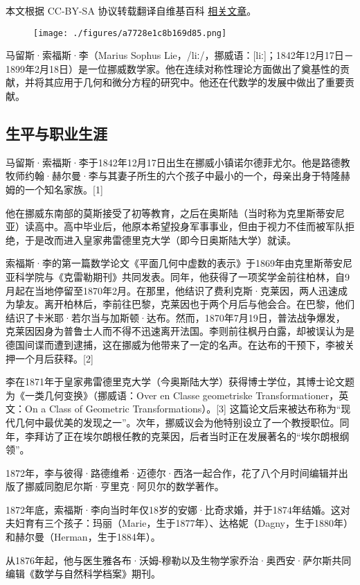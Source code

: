 
本文根据 CC-BY-SA 协议转载翻译自维基百科 \href{https://en.wikipedia.org/wiki/Sophus_Lie}{相关文章}。

\begin{figure}[ht]
\centering
\texttt{[image: ./figures/a7728e1c8b169d85.png]}
\caption{} \label{fig_SFSL_1}
\end{figure}
马留斯·索福斯·李（Marius Sophus Lie，/liː/，挪威语：[liː]；1842年12月17日－1899年2月18日）是一位挪威数学家。他在连续对称性理论方面做出了奠基性的贡献，并将其应用于几何和微分方程的研究中。他还在代数学的发展中做出了重要贡献。
\subsection{生平与职业生涯}
马留斯·索福斯·李于1842年12月17日出生在挪威小镇诺尔德菲尤尔。他是路德教牧师约翰·赫尔曼·李与其妻子所生的六个孩子中最小的一个，母亲出身于特隆赫姆的一个知名家族。[1]

他在挪威东南部的莫斯接受了初等教育，之后在奥斯陆（当时称为克里斯蒂安尼亚）读高中。高中毕业后，他原本希望投身军事事业，但由于视力不佳而被军队拒绝，于是改而进入皇家弗雷德里克大学（即今日奥斯陆大学）就读。

索福斯·李的第一篇数学论文《平面几何中虚数的表示》于1869年由克里斯蒂安尼亚科学院与《克雷勒期刊》共同发表。同年，他获得了一项奖学金前往柏林，自9月起在当地停留至1870年2月。在那里，他结识了费利克斯·克莱因，两人迅速成为挚友。离开柏林后，李前往巴黎，克莱因也于两个月后与他会合。在巴黎，他们结识了卡米耶·若尔当与加斯顿·达布。然而，1870年7月19日，普法战争爆发，克莱因因身为普鲁士人而不得不迅速离开法国。李则前往枫丹白露，却被误认为是德国间谍而遭到逮捕，这在挪威为他带来了一定的名声。在达布的干预下，李被关押一个月后获释。[2]

李在1871年于皇家弗雷德里克大学（今奥斯陆大学）获得博士学位，其博士论文题为《一类几何变换》（挪威语：Over en Classe geometriske Transformationer，英文：On a Class of Geometric Transformations）。[3] 这篇论文后来被达布称为“现代几何中最优美的发现之一”。次年，挪威议会为他特别设立了一个教授职位。同年，李拜访了正在埃尔朗根任教的克莱因，后者当时正在发展著名的“埃尔朗根纲领”。

1872年，李与彼得·路德维希·迈德尔·西洛一起合作，花了八个月时间编辑并出版了挪威同胞尼尔斯·亨里克·阿贝尔的数学著作。

1872年底，索福斯·李向当时年仅18岁的安娜·比奇求婚，并于1874年结婚。这对夫妇育有三个孩子：玛丽（Marie，生于1877年）、达格妮（Dagny，生于1880年）和赫尔曼（Herman，生于1884年）。

从1876年起，他与医生雅各布·沃姆-穆勒以及生物学家乔治·奥西安·萨尔斯共同编辑《数学与自然科学档案》期刊。

